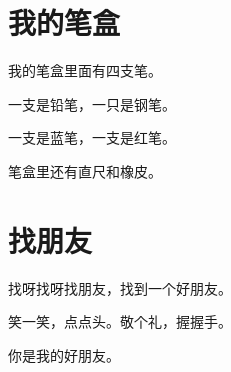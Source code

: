 \documentclass[12pt,UTF-8,openany]{ctexbook}
\begin{document}
\chapter{我的笔盒}

\begin{large}
    
    我的笔盒里面有四支笔。
    
    一支是铅笔，一只是钢笔。
    
    一支是蓝笔，一支是红笔。
    
    笔盒里还有直尺和橡皮。
    
\end{large}


\clearpage

\begin{center}
    
\end{center}


\hanzibox{}\hanzibox{}\hanzibox{}\hanzibox{}\hspace{1em}\hanzibox{}\hanzibox{}\hanzibox{}\hanzibox{}

\hanzibox{}\hanzibox{}\hanzibox{}\hanzibox{}\hspace{1em}\hanzibox{}\hanzibox{}\hanzibox{}\hanzibox{}

\hanzibox{}\hanzibox{}\hanzibox{}\hanzibox{}\hspace{1em}\hanzibox{}\hanzibox{}\hanzibox{}\hanzibox{}

\hanzibox{}\hanzibox{}\hanzibox{}\hanzibox{}\hspace{1em}




\chapter{找朋友}

\begin{large}
    
    找呀找呀找朋友，找到一个好朋友。
    
    笑一笑，点点头。敬个礼，握握手。
    
    你是我的好朋友。
    
\end{large}


\clearpage

\begin{center}
    
\end{center}
\end{document}
